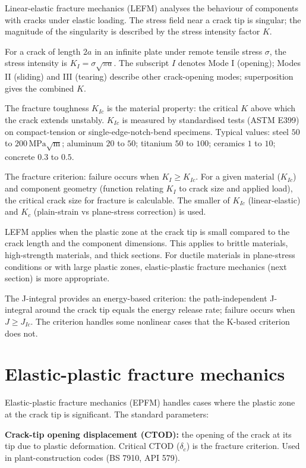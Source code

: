 Linear-elastic fracture mechanics (LEFM) analyses the behaviour of components with cracks under elastic loading. The stress field near a crack tip is singular; the magnitude of the singularity is described by the stress intensity factor $K$.

For a crack of length $2a$ in an infinite plate under remote tensile stress $\sigma$, the stress intensity is $K_I = \sigma \sqrt{\pi a}$. The subscript $I$ denotes Mode I (opening); Modes II (sliding) and III (tearing) describe other crack-opening modes; superposition gives the combined $K$.

The fracture toughness $K_{Ic}$ is the material property: the critical $K$ above which the crack extends unstably. $K_{Ic}$ is measured by standardised tests (ASTM E399) on compact-tension or single-edge-notch-bend specimens. Typical values: steel $50$ to $200\,\text{MPa}\sqrt{\text{m}}$; aluminum $20$ to $50$; titanium $50$ to $100$; ceramics $1$ to $10$; concrete $0.3$ to $0.5$.

The fracture criterion: failure occurs when $K_I \geq K_{Ic}$. For a given material ($K_{Ic}$) and component geometry (function relating $K_I$ to crack size and applied load), the critical crack size for fracture is calculable. The smaller of $K_{Ic}$ (linear-elastic) and $K_c$ (plain-strain vs plane-stress correction) is used.

LEFM applies when the plastic zone at the crack tip is small compared to the crack length and the component dimensions. This applies to brittle materials, high-strength materials, and thick sections. For ductile materials in plane-stress conditions or with large plastic zones, elastic-plastic fracture mechanics (next section) is more appropriate.

The J-integral provides an energy-based criterion: the path-independent J-integral around the crack tip equals the energy release rate; failure occurs when $J \geq J_{Ic}$. The criterion handles some nonlinear cases that the K-based criterion does not.

\section{Elastic-plastic fracture mechanics}

Elastic-plastic fracture mechanics (EPFM) handles cases where the plastic zone at the crack tip is significant. The standard parameters:

\textbf{Crack-tip opening displacement (CTOD):} the opening of the crack at its tip due to plastic deformation. Critical CTOD ($\delta_c$) is the fracture criterion. Used in plant-construction codes (BS 7910, API 579).

